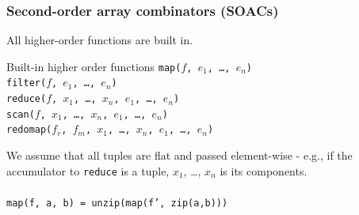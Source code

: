 \documentclass{beamer}
\begin{document}
\begin{frame}[fragile,t]
  \frametitle{Second-order array combinators (SOACs)}

  All higher-order functions are built in.

  \begin{block}{Built-in higher order functions}
    {\tt map($f$, $e_{1}$, \ldots, $e_{n}$)} \\
    {\tt filter($f$, $e_{1}$, \ldots, $e_{n}$)} \\
    {\tt reduce($f$, $x_{1}$, \ldots, $x_{n}$, $e_{1}$, \ldots, $e_{n}$)} \\
    {\tt scan($f$, $x_{1}$, \ldots, $x_{n}$, $e_{1}$, \ldots, $e_{n}$)} \\
    {\tt redomap($f_{r}$, $f_{m}$, $x_{1}$, \ldots, $x_{n}$, $e_{1}$, \ldots, $e_{n}$)} \\
  \end{block}

  We assume that all tuples are flat and passed element-wise - e.g., if
  the accumulator to {\tt reduce} is a tuple, $x_{1}$, \ldots, $x_{n}$
  is its components.
\pause
\\\hfill\\
  {\tt map(f, a, b) = unzip(map(f', zip(a,b)))}
\end{frame}
\end{document}
